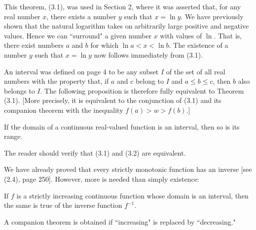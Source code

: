 This theorem, (3.1), was used in Section 2, where it was asserted that, for any real number $x$, there exists a number $y$ such that $x = \ln y$. We have previously shown that the natural logarithm takes on arbitrarily large positive and negative values. Hence we can ``surround" a given number $x$ with values of $\ln$. That is, there exist numbers $a$ and $b$ for which $\ln a < x < \ln b$. The existence of a number $y$ sueh that $x = \ln y$ now follows immediately from (3.1).

An interval was defined on page 4 to be any subset $I$ of the set of all real numbers with the property that, if $a$ and $c$ belong to $I$ and $a \leq b \leq c$, then $b$ also belongs to $I$. The following proposition is therefore fully equivalent to Theorem (3.1). [More precisely, it is equivalent to the conjunction of (3.1) and its companion theorem with the inequality $f(a) > w > f(b)$.]

\begin{theorem} %
\label{thm 5.3.2}
If the domain of a continuous real-valued function is an interval, then so is its range.
\end{theorem}

The reader should verify that (3.1) and (3.2) are equivalent.

We have already proved that every strictly monotonic function has an inverse [see (2.4), page 250]. However, more is needed than simply existence:

\begin{theorem} %
\label{thm 5.3.3}
If $f$ is a strictly increasing continuous function whose domain is an interval, then the same is true of the inverse function $f^{-1}$.
\end{theorem}

A companion theorem is obtained if ``increasing" is replaced by ``decreasing."

